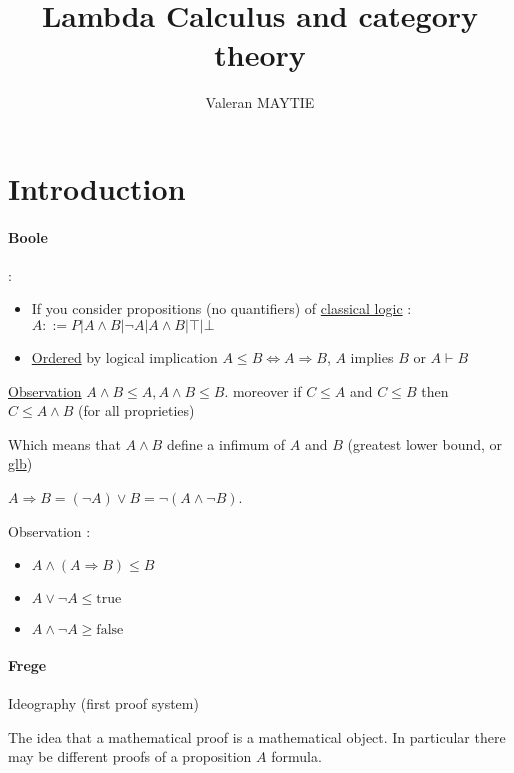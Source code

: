 \documentclass{article}
\title{Lambda Calculus and category theory}
\author{Valeran MAYTIE}
\date{}
\theoremstyle{plain}
\begin{document}
  \maketitle

  \tableofcontents

  \section{Introduction}

  \paragraph{Boole} :
    \begin{itemize}
      \item
        If you consider propositions (no quantifiers) of
        \underline{classical logic} : $A ::= P | A \wedge B | \neg A | A \wedge B |
        \top | \bot $
      \item
        \underline{Ordered} by logical implication $A \leq B \Leftrightarrow A
        \Rightarrow B$, $A$ implies $B$ or $A \vdash B$
    \end{itemize}

    \underline{Observation} $A \wedge B \leq A, A \wedge B \leq B$. moreover if
    $C \leq A$ and $C \leq B$ then $C \leq A \wedge B$ (for all proprieties)

    Which means that $A \wedge B$ define a infimum of $A$ and $B$ (greatest lower
    bound, or \underline{glb})

   $A \Rightarrow B = (\neg A) \vee B = \neg (A \wedge \neg B)$.

  \hspace{5mm}

  Observation : \begin{itemize}
    \item $A \wedge (A \Rightarrow B) \leq B$
    \item $A \vee \neg A \leq \text{true}$
    \item $A \wedge \neg A \geq \text{false}$
  \end{itemize}\paragraph{Frege} Ideography (first proof system)

  The idea that a mathematical proof is a mathematical object. In particular
  there may be different proofs of a proposition $A$ formula.
\end{document}

